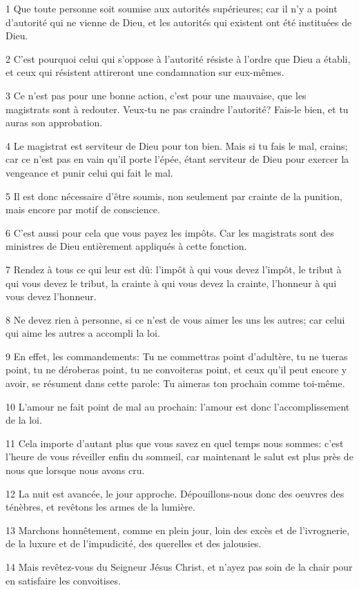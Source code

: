 \par 1 Que toute personne soit soumise aux autorités supérieures; car il n'y a point d'autorité qui ne vienne de Dieu, et les autorités qui existent ont été instituées de Dieu.
\par 2 C'est pourquoi celui qui s'oppose à l'autorité résiste à l'ordre que Dieu a établi, et ceux qui résistent attireront une condamnation sur eux-mêmes.
\par 3 Ce n'est pas pour une bonne action, c'est pour une mauvaise, que les magistrats sont à redouter. Veux-tu ne pas craindre l'autorité? Fais-le bien, et tu auras son approbation.
\par 4 Le magistrat est serviteur de Dieu pour ton bien. Mais si tu fais le mal, crains; car ce n'est pas en vain qu'il porte l'épée, étant serviteur de Dieu pour exercer la vengeance et punir celui qui fait le mal.
\par 5 Il est donc nécessaire d'être soumis, non seulement par crainte de la punition, mais encore par motif de conscience.
\par 6 C'est aussi pour cela que vous payez les impôts. Car les magistrats sont des ministres de Dieu entièrement appliqués à cette fonction.
\par 7 Rendez à tous ce qui leur est dû: l'impôt à qui vous devez l'impôt, le tribut à qui vous devez le tribut, la crainte à qui vous devez la crainte, l'honneur à qui vous devez l'honneur.
\par 8 Ne devez rien à personne, si ce n'est de vous aimer les uns les autres; car celui qui aime les autres a accompli la loi.
\par 9 En effet, les commandements: Tu ne commettras point d'adultère, tu ne tueras point, tu ne déroberas point, tu ne convoiteras point, et ceux qu'il peut encore y avoir, se résument dans cette parole: Tu aimeras ton prochain comme toi-même.
\par 10 L'amour ne fait point de mal au prochain: l'amour est donc l'accomplissement de la loi.
\par 11 Cela importe d'autant plus que vous savez en quel temps nous sommes: c'est l'heure de vous réveiller enfin du sommeil, car maintenant le salut est plus près de nous que lorsque nous avons cru.
\par 12 La nuit est avancée, le jour approche. Dépouillons-nous donc des oeuvres des ténèbres, et revêtons les armes de la lumière.
\par 13 Marchons honnêtement, comme en plein jour, loin des excès et de l'ivrognerie, de la luxure et de l'impudicité, des querelles et des jalousies.
\par 14 Mais revêtez-vous du Seigneur Jésus Christ, et n'ayez pas soin de la chair pour en satisfaire les convoitises.

